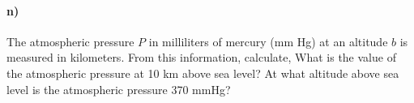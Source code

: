 \documentclass[../main.tex]{subfiles}
\begin{document}
\newpage


\paragraph{n)} The atmospheric pressure $P$ in milliliters of mercury (mm Hg) at an altitude $b$ is measured in kilometers.
From this information, calculate,
What is the value of the atmospheric pressure at 10 km above sea level?
At what altitude above sea level is the atmospheric pressure 370 mmHg?
\end{document}
